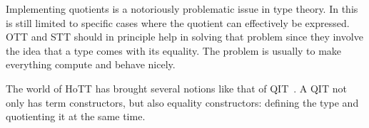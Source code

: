 Implementing quotients is a notoriously problematic issue in type theory.
In \Coq this is still limited to specific cases where the quotient can
effectively be expressed.
\acrshort{OTT} and \acrshort{STT} should in principle help in solving that
problem since they involve the idea that a type comes with its equality.
The problem is usually to make everything compute and behave nicely.

The world of \acrshort{HoTT} has brought several notions like that of
\acrfull{QIT}~.
A \acrfull{QIT} not only has term constructors, but also equality constructors:
defining the type and quotienting it at the same time.